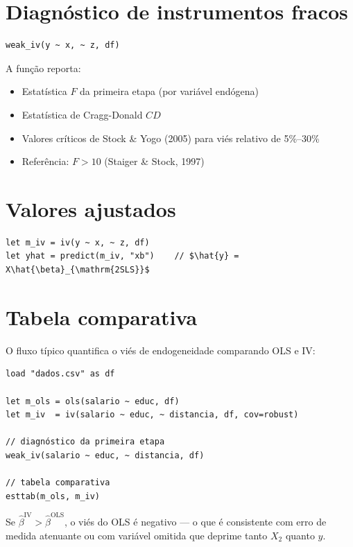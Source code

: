 \section{Diagnóstico de instrumentos fracos}

\begin{lstlisting}[caption={Teste de instrumentos fracos}]
weak_iv(y ~ x, ~ z, df)
\end{lstlisting}

A função reporta:
\begin{itemize}
  \item Estatística $F$ da primeira etapa (por variável endógena)
  \item Estatística de Cragg-Donald $CD$
  \item Valores críticos de Stock \& Yogo (2005) para viés relativo de 5\%–30\%
  \item Referência: $F > 10$ (Staiger \& Stock, 1997)
\end{itemize}

\section{Valores ajustados}

\begin{lstlisting}
let m_iv = iv(y ~ x, ~ z, df)
let yhat = predict(m_iv, "xb")    // $\hat{y} = X\hat{\beta}_{\mathrm{2SLS}}$
\end{lstlisting}

\section{Tabela comparativa}

O fluxo típico quantifica o viés de endogeneidade comparando OLS e IV:

\begin{lstlisting}[caption={Fluxo completo de análise IV}]
load "dados.csv" as df

let m_ols = ols(salario ~ educ, df)
let m_iv  = iv(salario ~ educ, ~ distancia, df, cov=robust)

// diagnóstico da primeira etapa
weak_iv(salario ~ educ, ~ distancia, df)

// tabela comparativa
esttab(m_ols, m_iv)
\end{lstlisting}

Se $\hat{\beta}^{\mathrm{IV}} > \hat{\beta}^{\mathrm{OLS}}$, o viés do OLS
é negativo — o que é consistente com erro de medida atenuante ou com
variável omitida que deprime tanto $X_2$ quanto $y$.
